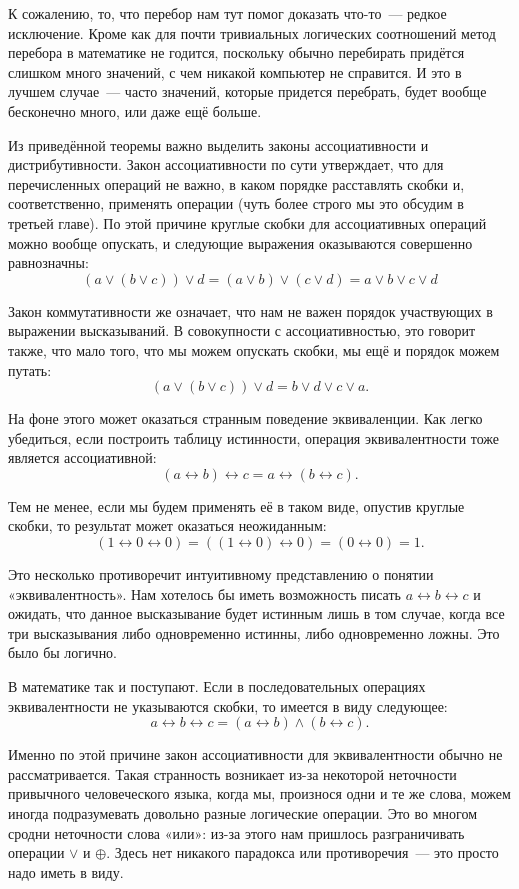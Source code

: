 К сожалению, то, что перебор нам тут помог доказать что-то~--- редкое исключение. Кроме как для почти тривиальных логических соотношений метод перебора в математике не годится, поскольку обычно перебирать придётся слишком много значений, с чем никакой компьютер не справится. И это в лучшем случае~--- часто значений, которые придется перебрать, будет вообще бесконечно много, или даже ещё больше.

Из приведённой теоремы важно выделить законы ассоциативности и дистрибутивности. Закон ассоциативности по сути утверждает, что для перечисленных операций не важно, в каком порядке расставлять скобки и, соответственно, применять операции (чуть более строго мы это обсудим в третьей главе). По этой причине круглые скобки для ассоциативных операций можно вообще опускать, и следующие выражения оказываются совершенно равнозначны:
$$
(a \lor (b \lor c)) \lor d = (a \lor b) \lor (c \lor d) = a \lor b \lor c \lor d
$$

Закон коммутативности же означает, что нам не важен порядок участвующих в выражении высказываний. В совокупности с ассоциативностью, это говорит также, что мало того, что мы можем опускать скобки, мы ещё и порядок можем путать:
$$
(a \lor (b \lor c)) \lor d = b \lor d \lor c \lor a.
$$

На фоне этого может оказаться странным поведение эквиваленции. Как легко убедиться, если построить таблицу истинности, операция эквивалентности тоже является ассоциативной:
$$
(a \leftrightarrow b) \leftrightarrow c = a \leftrightarrow (b \leftrightarrow c).
$$

Тем не менее, если мы будем применять её в таком виде, опустив круглые скобки, то результат может оказаться неожиданным:
$$
(1 \leftrightarrow 0 \leftrightarrow 0) = ((1 \leftrightarrow 0) \leftrightarrow 0) = (0 \leftrightarrow 0) = 1.
$$

Это несколько противоречит интуитивному представлению о понятии «эквивалентность». Нам хотелось бы иметь возможность писать $a \leftrightarrow b \leftrightarrow c$ и ожидать, что данное высказывание будет истинным лишь в том случае, когда все три высказывания либо одновременно истинны, либо одновременно ложны. Это было бы логично.

В математике так и поступают. Если в последовательных операциях эквивалентности не указываются скобки, то имеется в виду следующее:
$$
a \leftrightarrow b \leftrightarrow c = (a \leftrightarrow b) \land (b \leftrightarrow c).
$$

Именно по этой причине закон ассоциативности для эквивалентности обычно не рассматривается. Такая странность возникает из-за некоторой неточности привычного человеческого языка, когда мы, произнося одни и те же слова, можем иногда подразумевать довольно разные логические операции. Это во многом сродни неточности слова «или»: из-за этого нам пришлось разграничивать операции $\lor$ и $\oplus$. Здесь нет никакого парадокса или противоречия~--- это просто надо иметь в виду.

